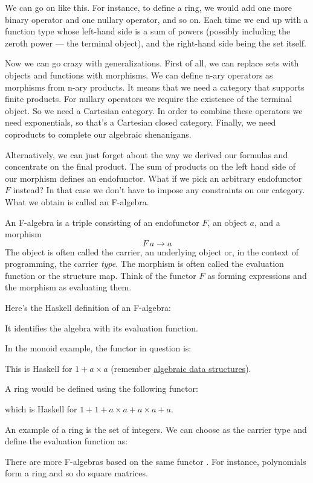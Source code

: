 We can go on like this. For instance, to define a ring, we would add one
more binary operator and one nullary operator, and so on. Each time we
end up with a function type whose left-hand side is a sum of powers
(possibly including the zeroth power --- the terminal object), and the
right-hand side being the set itself.

Now we can go crazy with generalizations. First of all, we can replace
sets with objects and functions with morphisms. We can define n-ary
operators as morphisms from n-ary products. It means that we need a
category that supports finite products. For nullary operators we require
the existence of the terminal object. So we need a Cartesian category.
In order to combine these operators we need exponentials, so that's a
Cartesian closed category. Finally, we need coproducts to complete our
algebraic shenanigans.

Alternatively, we can just forget about the way we derived our formulas
and concentrate on the final product. The sum of products on the left
hand side of our morphism defines an endofunctor. What if we pick an
arbitrary endofunctor $F$ instead? In that case we don't have to
impose any constraints on our category. What we obtain is called an
F-algebra.

An F-algebra is a triple consisting of an endofunctor $F$, an
object $a$, and a morphism
\[F\ a \to a\]
The object is often called the carrier, an underlying object or, in the
context of programming, the carrier \emph{type}. The morphism is often
called the evaluation function or the structure map. Think of the
functor $F$ as forming expressions and the morphism as evaluating
them.

Here's the Haskell definition of an F-algebra:

It identifies the algebra with its evaluation function.

In the monoid example, the functor in question is:

This is Haskell for $1 + a\times{}a$ (remember
\hyperref[simple-algebraic-data-types]{algebraic
data structures}).

A ring would be defined using the following functor:

which is Haskell for $1 + 1 + a\times{}a + a\times{}a + a$.

An example of a ring is the set of integers. We can choose
 as the carrier type and define the evaluation function
as:

There are more F-algebras based on the same functor . For
instance, polynomials form a ring and so do square matrices.

